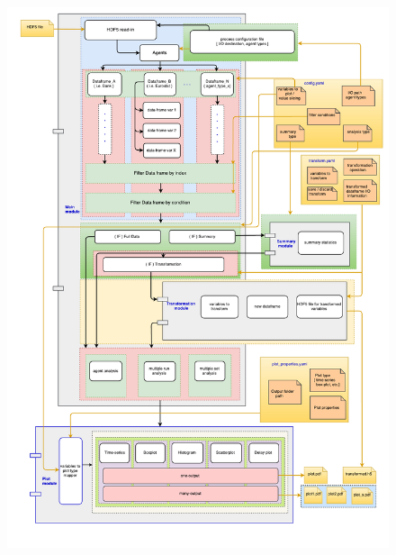 \documentclass[9pt,sansserif]{beamer}
\begin{document}
\begin{frame}{}\small
\vspace{-7.7cm}
\thispagestyle{empty}

\begin{figure}[hb!]
\centering\leavevmode
\graphicspath{{./png/}}
%
\hspace{-4cm}
\begin{minipage}{10cm}
\centering\leavevmode
\includegraphics[scale=0.40]{flame_pandas_workflow_diagram.pdf}
\end{minipage}
\end{figure}
\end{frame}
\end{document}
